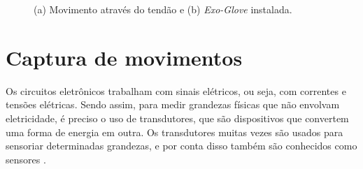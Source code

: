 \documentclass[
	12pt,				%
	openright,			%
	oneside,			%
	a4paper,			%
	english,			%
	brazil				%
	]{abntex2}
\begin{document}
	\begin{figure}[!htb]
		 \centering
		 \caption{(a) Movimento através do tendão e (b) \textit{Exo-Glove} instalada.} 
		 \centering
		 \label{Fig:hand-tendon-flex1-and-exo-glove1}
	\end{figure}





		
		\section{Captura de movimentos}



		Os circuitos eletrônicos trabalham com sinais elétricos, ou seja, com correntes e tensões elétricas. Sendo assim, para medir grandezas físicas que não envolvam eletricidade, é preciso o uso de transdutores, que são dispositivos que convertem uma forma de energia em outra. Os transdutores muitas vezes são usados para sensoriar determinadas grandezas, e por conta disso também são conhecidos como sensores \cite{ncb2012eletronicabasica}.
\end{document}
